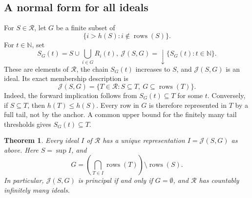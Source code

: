 \documentclass[10pt,a4paper]{article}
\newtheorem{theorem}{Theorem}[section]
\theoremstyle{definition}
\newcommand{\N}{\mathbb N}
\newcommand{\RR}{\mathcal R}
\newcommand{\rows}{\operatorname{rows}}
\begin{document}
\subsection{A normal form for all ideals}
For $S\in\RR$, let $G$ be a finite subset of
\[
 \{i>h(S):i\notin\rows(S)\}.
\]
For $t\in\N$, set
\[
 S_G(t)=S\cup\bigcup_{i\in G}R_i(t),
 ~
 \mathcal J(S,G)={\downarrow}\{S_G(t):t\in\N\}.
\]
These are elements of $\RR$, the chain $S_G(t)$ increases to $S$, and $\mathcal J(S,G)$ is an ideal. Its exact membership description is
\begin{equation}\label{fan:membership}
 \mathcal J(S,G)
 =\{T\in\RR:S\subseteq T,\ G\subseteq\rows(T)\}.
\end{equation}
Indeed, the forward implication follows from $S_G(t)\subseteq T$ for some $t$. Conversely, if $S\subseteq T$, then $h(T)\leq h(S)$. Every row in $G$ is therefore represented in $T$ by a full tail, not by the anchor. A common upper bound for the finitely many tail thresholds gives $S_G(t)\subseteq T$.


\begin{theorem}\label{fan:ideals}
Every ideal $I$ of $\RR$ has a unique representation $I=\mathcal J(S,G)$ as above. Here $S=\sup I$, and
\begin{equation}\label{fan:recoverG}
 G=\left(\bigcap_{T\in I}\rows(T)\right)\setminus\rows(S).
\end{equation}
In particular, $\mathcal J(S,G)$ is principal if and only if $G=\emptyset$, and $\RR$ has countably infinitely many ideals.
\end{theorem}
\end{document}
